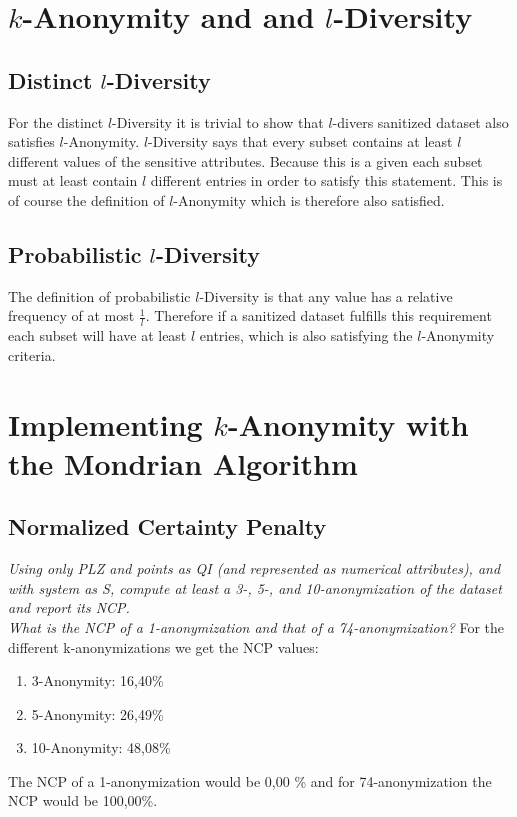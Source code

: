 \documentclass{report}
\begin{document}
	\section{$k$-Anonymity and and $l$-Diversity}
	\startsection
		\subsection{Distinct $l$-Diversity}
		\startsubsection
			For the distinct $l$-Diversity it is trivial to show that $l$-divers sanitized dataset also satisfies $l$-Anonymity. $l$-Diversity says that every subset contains at least $l$ different values of the sensitive attributes. Because this is a given each subset must at least contain $l$ different entries in order to satisfy this statement. This is of course the definition of $l$-Anonymity which is therefore also satisfied.
		\closesection
		\subsection{Probabilistic $l$-Diversity}
		\startsubsection
			The definition of probabilistic $l$-Diversity is that any value has a relative frequency of at most $\frac{1}{l}$. Therefore if a sanitized dataset fulfills this requirement each subset will have at least $l$ entries, which is also satisfying the $l$-Anonymity criteria.
		\closesection
	\closesection
	
	\section{Implementing $k$-Anonymity with the Mondrian Algorithm}
	\startsection
		\renewcommand{\thesubsection}{\thesection.\alph{subsection}}
		\hfill \vspace{-1cm}
		
		\subsection{Normalized Certainty Penalty}
		\textit{Using only PLZ and points as QI (and represented as numerical attributes), and with system as S, compute at least a 3-, 5-, and 10-anonymization of the dataset and report its NCP. \\ What is the NCP of a 1-anonymization and that of a 74-anonymization?}
		\startsubsection
			For the different k-anonymizations we get the NCP values:
			\begin{enumerate}[(1)]
				\item 3-Anonymity: 16,40\%
				\item 5-Anonymity: 26,49\%
				\item 10-Anonymity: 48,08\%
			\end{enumerate}
			The NCP of a 1-anonymization would be 0,00 \% and for 74-anonymization the NCP would be 100,00\%.
		\closesection
		
\end{document}
